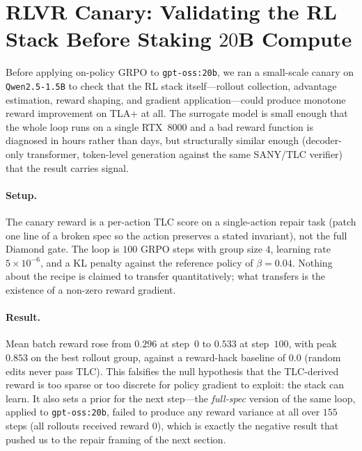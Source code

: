 \documentclass[11pt]{article}
\begin{document}
\section{RLVR Canary: Validating the RL Stack Before Staking $20$B Compute}
\label{sec:canary}

Before applying on-policy GRPO to \texttt{gpt-oss:20b}, we ran a
small-scale canary on \texttt{Qwen2.5-1.5B} to check that the RL stack
itself---rollout collection, advantage estimation, reward shaping,
and gradient application---could produce monotone reward improvement
on TLA+ at all. The surrogate model is small enough that the whole
loop runs on a single RTX~8000 and a bad reward function is diagnosed
in hours rather than days, but structurally similar enough (decoder-only
transformer, token-level generation against the same SANY/TLC verifier)
that the result carries signal.

\paragraph{Setup.} The canary reward is a per-action TLC score on a
single-action repair task (patch one line of a broken spec so the
action preserves a stated invariant), not the full Diamond gate. The
loop is $100$ GRPO steps with group size $4$, learning rate
$5\!\times\!10^{-6}$, and a KL penalty against the reference policy of
$\beta=0.04$. Nothing about the recipe is claimed to transfer
quantitatively; what transfers is the existence of a non-zero
reward gradient.

\paragraph{Result.} Mean batch reward rose from $0.296$ at step~$0$ to
$0.533$ at step~$100$, with peak $0.853$ on the best rollout group,
against a reward-hack baseline of $0.0$ (random edits never pass TLC).
This falsifies the null hypothesis that the TLC-derived reward is
too sparse or too discrete for policy gradient to exploit: the stack
can learn. It also sets a prior for the next step---the
\emph{full-spec} version of the same loop, applied to \texttt{gpt-oss:20b},
failed to produce any reward variance at all over $155$ steps (all
rollouts received reward $0$), which is exactly the negative result
that pushed us to the repair framing of the next section.

\end{document}
